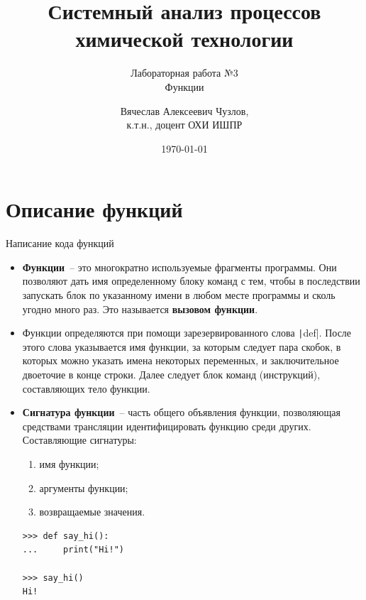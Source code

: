\documentclass[aspectratio=169, mathserif]{beamer}%
\title{\LARGE{Системный анализ процессов химической технологии}}
\subtitle{Лабораторная работа №3 \\ Функции}
\author[]{Вячеслав Алексеевич Чузлов, \\
к.т.н., доцент ОХИ ИШПР}
\date{\today}
\begin{document}
\newcommand{\pythoninline}[1]{%
	\colorbox{white}{%
		\parbox[b][.6em]{\widthof{\texttt{#1}}}{\texttt{#1}}%
	}%
}


\titleframe%




\section{Описание функций}
\sectionframe


\begin{frame}[fragile]{Написание кода функций}
\scriptsize
\begin{itemize}
\item \textcolor{extraorange}{\textbf{Функции}}~-- это многократно используемые фрагменты программы. Они позволяют дать имя определенному блоку команд с тем, чтобы в последствии запускать блок по указанному имени в любом месте программы и сколь угодно много раз. Это называется \textbf{вызовом функции}.
\item Функции определяются при помощи зарезервированного слова \texttt|def|. После этого слова указывается имя функции, за которым следует пара скобок, в которых можно указать имена некоторых переменных, и заключительное двоеточие в конце строки. Далее следует блок команд (инструкций), составляющих тело функции.

\item \textcolor{extraorange}{\textbf{Сигнатура функции}}~-- часть общего объявления функции, позволяющая средствами трансляции идентифицировать функцию среди других. Составляющие сигнатуры:
\begin{enumerate}
\scriptsize
\item имя функции;
\item аргументы функции;
\item возвращаемые значения.
\end{enumerate} 

\begin{verbatim}
>>> def say_hi():
...     print("Hi!")       

>>> say_hi()
Hi!
\end{verbatim}

\end{itemize}
\vfill
\end{frame}
\end{document}
